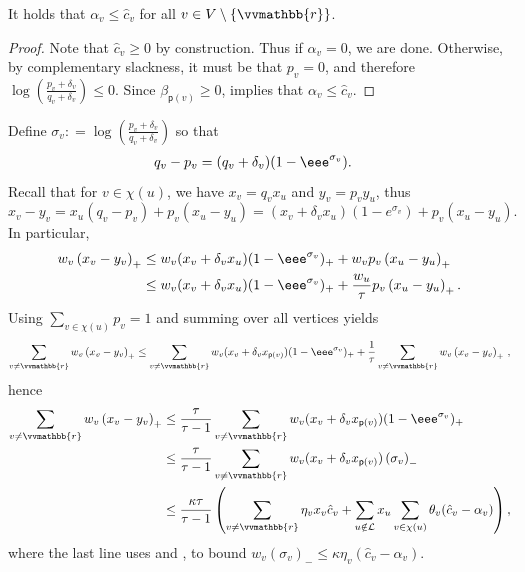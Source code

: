 \documentclass{toc}
\newcommand{\calL}{\mathcal L}
\newcommand{\vvr}{\vvmathbb{r}}
\newcommand{\seteq}{\mathrel{\mathop:}=}
\newcommand{\sfp}{\mathsf{p}}
\begin{document}
\begin{lemma}\label{lem:alphas}
	It holds that $\alpha_v \leq \hat{c}_v$ for all $v \in V \setminus \{\vvr\}$.
\end{lemma}

\begin{proof}
	Note that $\hat{c}_v \geq 0$ by construction.  Thus if $\alpha_v = 0$, we are done.
	Otherwise, by complementary slackness, it must be that $p_v = 0$, and therefore
	$\log(\frac{p_v+\delta_v}{q_v+\delta_v}) \leq 0$.  Since $\beta_{\sfp(v)} \geq 0$,  implies that
	$\alpha_v \leq \hat{c}_v$.
\end{proof}

Define
$\sigma_v \seteq \log \left(\frac{p_v+\delta_v}{q_v+\delta_v}\right)$
so that
\begin{align}
q_v - p_v &= (q_v + \delta_v) (1-\eee^{\sigma_v}). \label{eq:qp}
\end{align}
Recall that for $v \in \chi(u)$, we have $x_v = q_v x_u$ and $y_v = p_v y_u$, thus
\[
x_v - y_v = x_u (q_v - p_v) + p_v (x_u - y_u) = (x_v+\delta_v x_u) (1-e^{\sigma_v}) + p_v (x_u - y_u).
\]
In particular,
\begin{align*}
w_v \left(x_v-y_v\right)_+ &\leq w_v (x_v+\delta_v x_u) (1-\eee^{\sigma_v})_+ + w_v p_v \left(x_u-y_u\right)_+ \\
&\leq w_v (x_v+\delta_v x_u) (1-\eee^{\sigma_v})_+ + \frac{w_u}{\tau} p_v \left(x_u-y_u\right)_+.
\end{align*}
Using $\sum_{v \in \chi(u)} p_v = 1$ and
summing over all vertices yields
\[
\sum_{v \neq \vvr} w_v \left(x_v-y_v\right)_+ \leq \sum_{v \neq \vvr} w_v (x_v+\delta_v x_{\sfp(v)}) (1-\eee^{\sigma_v})_{+} + \frac{1}{\tau} \sum_{v \neq \vvr} w_v \left(x_v-y_v\right)_+\,,
\]
hence
\begin{align}
\sum_{v \neq \vvr} w_v \left(x_v-y_v\right)_+ &\leq \frac{\tau}{\tau-1} \sum_{v \neq \vvr} w_v (x_v+\delta_v x_{\sfp(v)}) (1-\eee^{\sigma_v})_+ \nonumber \\ 
&\leq \frac{\tau}{\tau-1} \sum_{v \neq \vvr} w_v (x_v+\delta_v x_{\sfp(v)}) \left(\sigma_v\right)_{-} \nonumber \\
&\leq\frac{\kappa \tau}{\tau-1} \left(\sum_{v \neq \vvr} \eta_v x_v \hat{c}_v + \sum_{u \notin \calL} x_u \sum_{v \in \chi(u)} \theta_v (\hat{c}_v-\alpha_v)\right),
\label{eq:mvmt0}
\end{align}
where the last line uses
 and , to bound
$w_v (\sigma_v)_{-} \leq \kappa \eta_v\left(\hat{c}_v - \alpha_v\right)$.
\end{document}

